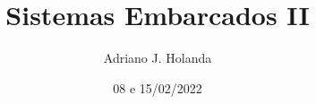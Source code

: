 \documentclass[a4paper]{article}
\title{Sistemas Embarcados II}
\author{Adriano J. Holanda}
\begin{document}
\date{08 e 15/02/2022}
\maketitle

\end{document}
